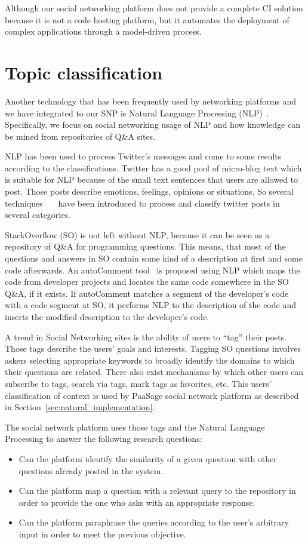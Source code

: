 Although our social networking platform does not provide a complete CI solution because it is not a code hosting platform, but it automates the deployment of complex applications through a model-driven process. 

\section{Topic classification}
\label{sec:topic_class}
Another technology that has been frequently used by networking platforms and we have integrated to our SNP is Natural Language Processing (NLP)~\cite{manning1999foundations}. Specifically, we focus on social networking usage of NLP and how knowledge can be mined from repositories of Q\&A sites. 

NLP has been used to process Twitter's messages and come to some results according to the classifications. Twitter has a good pool of micro-blog text which is suitable for NLP because of the small text sentences that users are allowed to post. Those posts describe emotions, feelings, opinions or situations. So several techniques~\cite{pak2010twitter}~\cite{verma2011natural}~\cite{go2009twitter} have been introduced to process and classify twitter posts in several categories.

StackOverflow (SO) is not left without NLP, because it can be seen as a repository of Q\&A for programming questions. This means, that most of the questions and answers in SO contain some kind of a description at first and some code afterwards.    
An autoComment tool~\cite{wong2013autocomment} is proposed using NLP which maps the code from developer projects and locates the same code somewhere in the SO Q\&A, if it exists. If autoComment matches a segment of the developer's code with a code segment at SO, it performs NLP to the description of the code and inserts the modified description to the developer's code. 

A trend in Social Networking sites is the ability of users to ``tag'' their posts. Those tags describe the users' goals and interests. Tagging SO questions involves askers selecting appropriate keywords to broadly identify the domains
to which their questions are related. There also exist mechanisms by which other users can subscribe to tags, search via
tags, mark tags as favorites, etc. This users' classification of context is used by PaaSage social network platform as described in Section~\ref{sec:natural_implementation}. 

The social network platform uses those tags and the Natural Language Processing to answer the following research questions:
\begin{itemize}
\item Can the platform identify the similarity of a given question with other questions already posted in the system.
\item Can the platform map a question with a relevant query to the repository in order to provide the one who asks with an appropriate response.
\item Can the platform paraphrase the queries according to the user's arbitrary input in order to meet the previous objective. 
\end{itemize}

